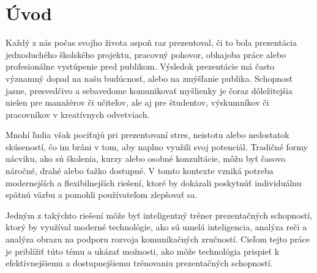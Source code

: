 \chapter{Úvod}
\pagestyle{plain}

Každý z nás počas svojho života aspoň raz prezentoval, či to bola prezentácia jednoduchého školského projektu, pracovný pohovor, obhajoba práce alebo profesionálne vystúpenie pred publikom. Výsledok prezentácie má často významný dopad na našu budúcnosť, alebo na zmýšľanie publika. Schopnosť jasne, presvedčivo a sebavedome komunikovať myšlienky je čoraz dôležitejšia nielen pre manažérov či učiteľov, ale aj pre študentov, výskumníkov či pracovníkov v kreatívnych odvetviach.

Mnohí ľudia však pociťujú pri prezentovaní stres, neistotu alebo nedostatok skúseností, čo im bráni v tom, aby naplno využili svoj potenciál. Tradičné formy nácviku, ako sú školenia, kurzy alebo osobné konzultácie, môžu byť časovo náročné, drahé alebo ťažko dostupné. V tomto kontexte vzniká potreba modernejších a flexibilnejších riešení, ktoré by dokázali poskytnúť individuálnu spätnú väzbu a pomohli používateľom zlepšovať sa.

Jedným z takýchto riešení môže byť inteligentný tréner prezentačných schopností, ktorý by využíval moderné technológie, ako sú umelá inteligencia, analýza reči a analýza obrazu na podporu rozvoja komunikačných zručností. Cieľom tejto práce je priblížiť túto tému a ukázať možnosti, ako môže technológia prispieť k efektívnejšiemu a dostupnejšiemu trénovaniu prezentačných schopností.